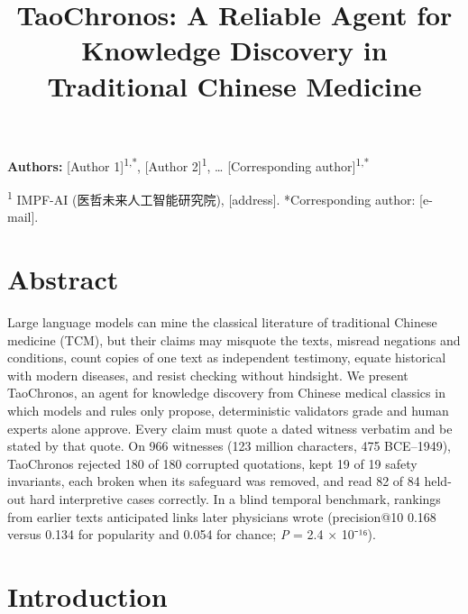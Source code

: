 \documentclass[
]{article}
\title{TaoChronos: A Reliable Agent for Knowledge Discovery in
Traditional Chinese Medicine}
\author{}
\date{}
\begin{document}
\maketitle

\textbf{Authors:} {[}Author 1{]}\textsuperscript{1,*}, {[}Author
2{]}\textsuperscript{1}, \ldots{} {[}Corresponding
author{]}\textsuperscript{1,*}

\textsuperscript{1} IMPF-AI (医哲未来人工智能研究院), {[}address{]}.
*Corresponding author: {[}e-mail{]}.

\hypertarget{abstract}{%
\section{Abstract}\label{abstract}}

Large language models can mine the classical literature of traditional
Chinese medicine (TCM), but their claims may misquote the texts, misread
negations and conditions, count copies of one text as independent
testimony, equate historical with modern diseases, and resist checking
without hindsight. We present TaoChronos, an agent for knowledge
discovery from Chinese medical classics in which models and rules only
propose, deterministic validators grade and human experts alone approve.
Every claim must quote a dated witness verbatim and be stated by that
quote. On 966 witnesses (123 million characters, 475 BCE--1949),
TaoChronos rejected 180 of 180 corrupted quotations, kept 19 of 19
safety invariants, each broken when its safeguard was removed, and read
82 of 84 held-out hard interpretive cases correctly. In a blind temporal
benchmark, rankings from earlier texts anticipated links later
physicians wrote (precision@10 0.168 versus 0.134 for popularity and
0.054 for chance; \emph{P} = 2.4 × 10⁻¹⁶).

\hypertarget{introduction}{%
\section{Introduction}\label{introduction}}
\end{document}
